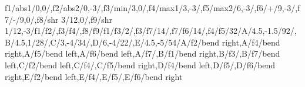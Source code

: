 \begin{compatibilitygraph}{f1/abs1/{0,0}/,f2/abs2/{0,-3}/,f3/min/{3,0}/,f4/max1/{3,-3}/,f5/max2/{6,-3}/,f6/+/{9,-3}/,f7/-/{9,0}/,f8/shr 3/{12,0}/,f9/shr 1/{12,-3}/}{f1/f2/,f3/f4/,f8/f9/}{f1/f3/2/,f3/f7/14/,f7/f6/14/,f4/f5/32/}{A/{4.5,-1.5}/92/,B/{4.5,1}/28/,C/{3,-4}/34/,D/{6,-4}/22/,E/{4.5,-5}/54/}{A/f2/bend right,A/f4/bend right,A/f5/bend left,A/f6/bend left,A/f7/,B/f1/bend right,B/f3/,B/f7/bend left,C/f2/bend left,C/f4/,C/f5/bend right,D/f4/bend left,D/f5/,D/f6/bend right,E/f2/bend left,E/f4/,E/f5/,E/f6/bend right}{}
\end{compatibilitygraph}